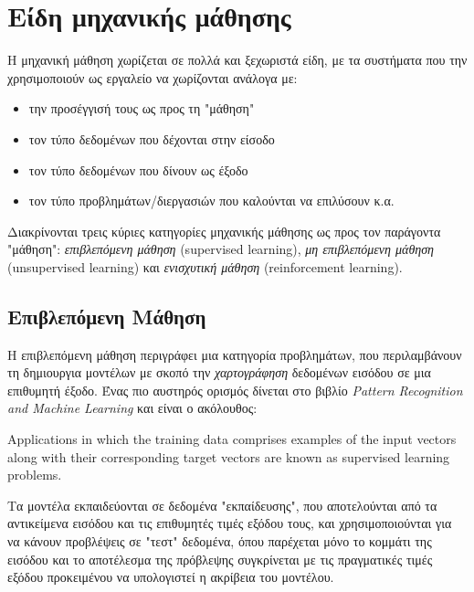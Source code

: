 \section{Είδη μηχανικής μάθησης}

Η μηχανική μάθηση χωρίζεται σε πολλά και ξεχωριστά είδη, με τα συστήματα που την χρησιμοποιούν ως εργαλείο να χωρίζονται ανάλογα με:

\medskip
\begin{itemize}
    \item την προσέγγισή τους ως προς τη "μάθηση"
    \item τον τύπο δεδομένων που δέχονται στην είσοδο
    \item τον τύπο δεδομένων που δίνουν ως έξοδο
    \item τον τύπο προβλημάτων/διεργασιών που καλούνται να επιλύσουν κ.α.
\end{itemize}

\medskip
Διακρίνονται τρεις κύριες κατηγορίες μηχανικής μάθησης ως προς τον παράγοντα "μάθηση": \textit{επιβλεπόμενη μάθηση} (supervised learning), \textit{μη επιβλεπόμενη μάθηση}  (unsupervised learning) και \textit{ενισχυτική μάθηση} (re\-inforcement learning).

\subsection{Επιβλεπόμενη Μάθηση}

Η επιβλεπόμενη μάθηση περιγράφει μια κατηγορία προβλημάτων, που περιλαμβάνουν τη δημιουργια μοντέλων με σκοπό την \textit{χαρτογράφηση} δεδομένων εισόδου σε μια επιθυμητή έξοδο. Ένας πιο αυστηρός ορισμός δίνεται στο βιβλίο \textit{Pattern Recognition and Machine Learning}  \cite{Bishop2006} και είναι ο ακόλουθος:

\medskip
\begin{displayquote}
Applications in which the training data comprises examples of the input vectors along with their corresponding target vectors are known as supervised learning problems. 
\end{displayquote}

\medskip
Τα μοντέλα εκπαιδεύονται σε δεδομένα "εκπαίδευσης", που αποτελούνται από τα αντικείμενα εισόδου και τις επιθυμητές τιμές εξόδου τους, και χρησιμοποιούνται για να κάνουν προβλέψεις σε "τεστ" δεδομένα, όπου παρέχεται μόνο το κομμάτι της εισόδου και το αποτέλεσμα της πρόβλεψης συγκρίνεται με τις πραγματικές τιμές εξόδου προκειμένου να υπολογιστεί η ακρίβεια του μοντέλου.

